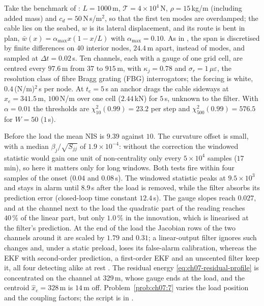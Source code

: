 \begin{example}
\label{ex:ch07-cable-das}
Take the benchmark of \cite{oliva_quadratic_ejc_2026}: $L=1000$\,m, $\mathcal{T}=4\times10^{4}$\,N, $\rho=15$\,kg/m (including added mass) and $c_d=50$\,N\,s/m$^{2}$, so that the first ten modes are overdamped; the cable lies on the seabed, $w$ is its lateral displacement, and its route is bent in plan, $\bar w(x)=\alpha_{\max}x(1-x/L)$ with $\alpha_{\max}=0.10$. As in \cite{oliva_quadratic_ejc_2026}, the span is discretised by finite differences on $40$ interior nodes, $24.4$\,m apart, instead of modes, and sampled at $\Delta t=0.02$\,s. Ten channels, each with a gauge of one grid cell, are centred every $97.6$\,m from $37$ to $915$\,m, with $\kappa_j=0.78$ and $\sigma_r=1$\,$\mu\varepsilon$, the resolution class of fibre Bragg grating (FBG) interrogators; the forcing is white, $0.4$\,(N/m)$^{2}$\,s per node. At $t_e=5$\,s an anchor drags the cable sideways at $x_e=341.5$\,m, $100$\,N/m over one cell ($2.44$\,kN) for $5$\,s, unknown to the filter. With $\alpha=0.01$ the thresholds are $\chi^{2}_{10}(0.99)=23.2$ per step and $\chi^{2}_{500}(0.99)=576.5$ for $W=50$ ($1$\,s).

Before the load the mean NIS is $9.39$ against $10$. The curvature offset is small, with a median $\beta_j/\sqrt{S_{jj}}$ of $1.9\times10^{-4}$: without the correction the windowed statistic would gain one unit of non-centrality only every $5\times10^{4}$ samples ($17$\,min), so here it matters only for long windows. Both tests fire within four samples of the onset ($0.04$ and $0.08$\,s). The windowed statistic peaks at $9.5\times10^{3}$ and stays in alarm until $8.9$\,s after the load is removed, while the filter absorbs its prediction error (closed-loop time constant $12.4$\,s). The gauge slopes reach $0.027$, and at the channel next to the load the quadratic part of the reading reaches $40\,\%$ of the linear part, but only $1.0\,\%$ in the innovation, which is linearised at the filter's prediction. At the end of the load the Jacobian rows of the two channels around it are scaled by $1.79$ and $0.31$; a linear-output filter \cite{fioravanti_cable_med_2026} ignores such changes and, under a static preload, loses its false-alarm calibration, whereas the EKF with second-order prediction, a first-order EKF and an unscented filter keep it, all four detecting alike at rest \cite{oliva_quadratic_ejc_2026}. The residual energy \eqref{eq:ch07-residual-profile} is concentrated on the channel at $329$\,m, whose gauge ends at the load, and the centroid $\hat x_e=328$\,m is $14$\,m off. Problem~\ref{prob:ch07:7} varies the load position and the coupling factors; the script is in .
\end{example}

